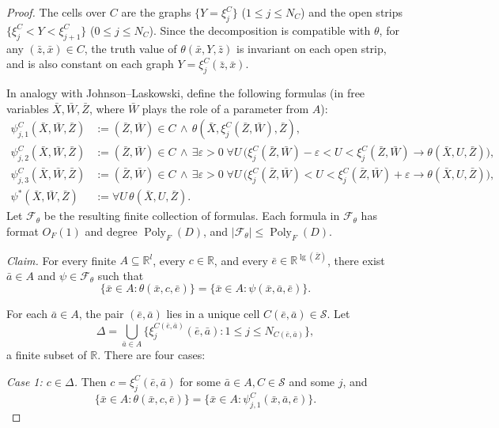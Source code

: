 \documentclass[11pt]{article}
\theoremstyle{plain}
\theoremstyle{definition}
\theoremstyle{remark}
\newcommand{\R}{\mathbb{R}}
\newcommand{\cF}{\mathcal{F}}
\newcommand{\cS}{\mathcal{S}}
\newcommand{\Poly}{\operatorname{Poly}}
\begin{document}
\begin{proof}
The cells over $C$ are the graphs $\{Y = \xi_j^C\}$ ($1 \le j \le N_C$) and the open strips $\{\xi_j^C < Y < \xi_{j+1}^C\}$ ($0 \le j \le N_C$). Since the decomposition is compatible with $\theta$, for any $(\bar z, \bar x) \in C$, the truth value of $\theta(\bar x, Y, \bar z)$ is invariant on each open strip, and is also constant on each graph $Y=\xi_j^C(\bar z,\bar x)$.

In analogy with Johnson--Laskowski, define the following formulas (in free variables $\bar X, \bar W, \bar Z$, where $\bar W$ plays the role of a parameter from $A$):
\begin{align*}
  \psi^C_{j, 1}(\bar X, \bar W, \bar Z) &:= (\bar Z, \bar W) \in C \,\land\, \theta(\bar X, \xi_j^C(\bar Z, \bar W), \bar Z), \\
  \psi^C_{j, 2}(\bar X, \bar W, \bar Z) &:= (\bar Z, \bar W) \in C \,\land\, \exists \varepsilon > 0 \;\forall U \, \big( \xi_j^C(\bar Z, \bar W) - \varepsilon < U < \xi_j^C(\bar Z, \bar W) \rightarrow \theta(\bar X, U, \bar Z) \big), \\
  \psi^C_{j, 3}(\bar X, \bar W, \bar Z) &:= (\bar Z, \bar W) \in C \,\land\, \exists \varepsilon > 0 \;\forall U \, \big( \xi_j^C(\bar Z, \bar W) < U < \xi_j^C(\bar Z, \bar W) + \varepsilon \rightarrow \theta(\bar X, U, \bar Z) \big), \\
  \psi^*(\bar X, \bar W, \bar Z) &:= \forall U \, \theta(\bar X, U, \bar Z).
\end{align*}
Let $\cF_\theta$ be the resulting finite collection of formulas. Each formula in $\cF_\theta$ has format $O_F(1)$ and degree $\Poly_F(D)$, and $|\cF_\theta| \le \Poly_F(D)$.

\smallskip\noindent\textit{Claim.}
For every finite $A \subseteq \R^l$, every $c \in \R$, and every $\bar e \in \R^{\lg(\bar Z)}$, there exist $\bar a \in A$ and $\psi \in \cF_\theta$ such that
\[
  \{\bar x\in A:\theta(\bar x, c, \bar e)\}
  =
  \{\bar x\in A:\psi(\bar x, \bar a, \bar e)\}.
\]

\smallskip

For each $\bar a \in A$, the pair $(\bar e, \bar a)$ lies in a unique cell $C(\bar e, \bar a) \in \cS$. Let
\[
  \Delta = \bigcup_{\bar a \in A} \{\xi_j^{C(\bar e, \bar a)}(\bar e, \bar a) : 1 \le j \le N_{C(\bar e, \bar a)}\},
\]
a finite subset of $\R$. There are four cases:

\textit{Case 1: $c \in \Delta$.} Then $c = \xi_j^C(\bar e, \bar a)$ for some $\bar a \in A, C \in \cS$ and some $j$, and
\[
  \{\bar x\in A:\theta(\bar x, c, \bar e)\}
  =
  \{\bar x\in A:\psi^C_{j, 1}(\bar x, \bar a, \bar e)\}.
\]


\end{proof}
\end{document}
